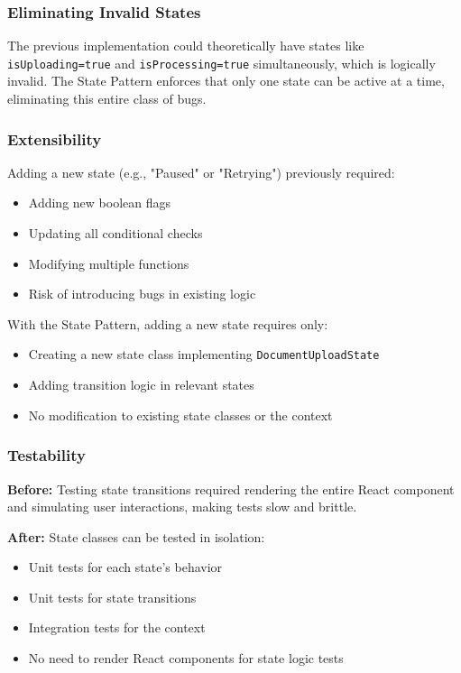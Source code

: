 \documentclass[11pt,a4paper]{article}
\begin{document}
\subsubsection{Eliminating Invalid States}

The previous implementation could theoretically have states like \texttt{isUploading=true} and \texttt{isProcessing=true} simultaneously, which is logically invalid. The State Pattern enforces that only one state can be active at a time, eliminating this entire class of bugs.

\subsubsection{Extensibility}

Adding a new state (e.g., "Paused" or "Retrying") previously required:
\begin{itemize}
    \item Adding new boolean flags
    \item Updating all conditional checks
    \item Modifying multiple functions
    \item Risk of introducing bugs in existing logic
\end{itemize}

With the State Pattern, adding a new state requires only:
\begin{itemize}
    \item Creating a new state class implementing \texttt{DocumentUploadState}
    \item Adding transition logic in relevant states
    \item No modification to existing state classes or the context
\end{itemize}

\subsubsection{Testability}

\textbf{Before:} Testing state transitions required rendering the entire React component and simulating user interactions, making tests slow and brittle.

\textbf{After:} State classes can be tested in isolation:
\begin{itemize}
    \item Unit tests for each state's behavior
    \item Unit tests for state transitions
    \item Integration tests for the context
    \item No need to render React components for state logic tests
\end{itemize}
\end{document}
